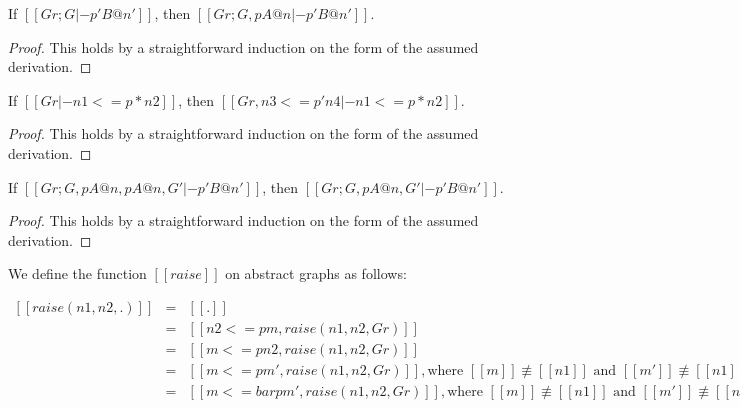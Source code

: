 \begin{lemma}[Weakening]
  \label{lemma:weakening}
  If $[[Gr ; G |- p' B @ n']]$, then $[[Gr ; G, p A @ n |- p' B @ n']]$.
\end{lemma}
  \begin{proof}
    This holds by a straightforward induction on the form of the assumed derivation.
  \end{proof}

\begin{lemma}
  \label{lemma:graph_weakening}
  If $[[Gr |- n1 <= p * n2]]$, then $[[Gr, n3 <= p' n4 |- n1 <= p * n2]]$.
\end{lemma}
  \begin{proof}
    This holds by a straightforward induction on the form of the assumed derivation.
  \end{proof}

\begin{lemma}[Contraction]
  \label{lemma:contract}
  If $[[Gr ; G , p A @ n , p A @ n , G' |- p' B @ n']]$, then
  $[[Gr ; G , p A @ n , G' |- p' B @ n']]$.
\end{lemma}
  \begin{proof}
    This holds by a straightforward induction on the form of the assumed derivation.
  \end{proof}
  
\begin{definition}
  \label{def:raise}
  We define the function $[[raise]]$ on abstract graphs as follows:
  \begin{center}
    \begin{math}
      \begin{array}{lll}
        [[raise ( n1 , n2 , . )]] & = & [[.]]\\
        [[raise ( n1 , n2 , (n1 <=p  m, Gr))]] & = & [[n2 <=p m , raise (n1 , n2, Gr)]]\\
        [[raise ( n1 , n2 , ( m <=p n1, Gr))]] & = & [[m <= p n2 , raise (n1 , n2, Gr)]]\\
        [[raise ( n1 , n2 , (m <=p m' , Gr ))]] & = & [[m <=  p m' , raise (n1 , n2, Gr)]], 
        \text{where } [[m]] \not\equiv [[n1]] \text{ and } [[m']] \not\equiv [[n1]].\\
        [[raise ( n1 , n2 , (m <=bar p m' , Gr ))]] & = &[[m <=  bar p m' , raise (n1 , n2, Gr)]],
        \text{where } [[m]] \not\equiv [[n1]] \text{ and } [[m']] \not\equiv [[n1]].\\
      \end{array}
    \end{math}
  \end{center}
\end{definition}

